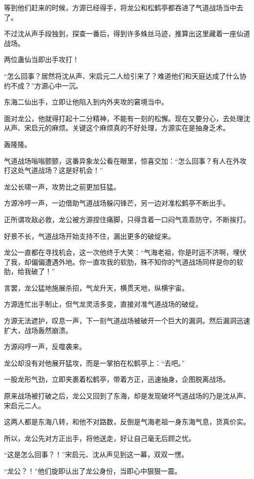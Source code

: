 \begin{this_body}
等到他们赶来的时候，方源已经得手，将龙公和松鹤亭都吞进了气道战场当中去了。

不过沈从声手段独到，探查一番后，得到许多蛛丝马迹，推算出这里藏着一座仙道战场。

两位蛊仙当即出手攻打！

“怎么回事？居然将沈从声、宋启元二人给引来了？难道他们和天庭达成了什么协约不成？”方源心中一沉。

东海二仙出手，立即让他陷入到内外夹攻的窘境当中。

面对龙公，他就得打起十二分精神，不能有一刻的松懈。现在又要分心，去处理沈从声、宋启元的麻烦。关键这个麻烦真的不好处理，方源实在是抽身乏术。

轰隆隆。

气道战场嗡嗡颤颤，这番异象龙公看在眼里，惊喜交加：“怎么回事？有人在外攻打这处气道战场？这是好机会！”

龙公长啸一声，攻势比之前更加狂猛。

方源冷哼一声，一边借助气道战场躲闪锋芒，另一边对准松鹤亭不断出手。

正所谓攻敌必救，龙公被方源捏住痛脚，只得含着一口闷气乖乖防守，不断挨打。

好景不长，气道战场开始支持不住，漏出更多的破绽来。

龙公一直都在寻找机会，这一次他终于大笑：“气海老祖，你是时运不济啊，埋伏了我，却偏偏遭遇外地。你一直攻我的软肋，殊不知你的气道战场同样是你的软肋，给我破了！”

言罢，龙公猛地施展杀招，气龙升天，横贯天地，纵横宇宙。

方源连忙出手制止，但气龙灵活多变，直接对准气道战场的破绽。

方源无法遮护，叹息一声，下一刻气道战场被破开一个巨大的漏洞。然后漏洞迅速扩大，战场轰然崩溃。

方源闷哼一声，反噬袭来。

龙公却没有对他展开猛攻，而是一掌拍在松鹤亭上：“去吧。”

一股龙形气劲，立即夹裹着松鹤亭，带着方正，迅速抽身，企图脱离战场。

原来战场被打破之后，龙公又回到了东海，却是发现破坏气道战场的乃是沈从声、宋启元二人。

这两人都是东海八转，和他不对路数，反倒是气海老祖一身东海气息，货真价实。

所以，龙公先对方正出手，将他送走，好让自己毫无后顾之忧。

“这是怎么回事？！”宋启元、沈从声见到这一幕，双双一愣。

“龙公？！”他们旋即认出了龙公身份，当即心中狠狠一震。


\end{this_body}
